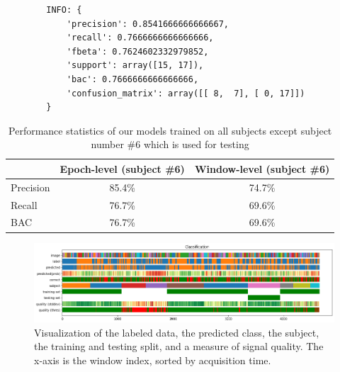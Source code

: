 
        \begin{verbatim}
        INFO: {
            'precision': 0.8541666666666667, 
            'recall': 0.7666666666666666, 
            'fbeta': 0.7624602332979852, 
            'support': array([15, 17]), 
            'bac': 0.7666666666666666, 
            'confusion_matrix': array([[ 8,  7], [ 0, 17]])
        }
        \end{verbatim}

        \begin{table}
            \begin{center}
                \begin{tabular}{lcc}
                  \toprule
                  & Epoch-level (subject \#6) & Window-level (subject \#6) \\ \midrule
                  Precision & 85.4\% & 74.7\% \\
                  Recall & 76.7\% & 69.6\% \\
                  BAC & 76.7\% & 69.6\% \\
                  \bottomrule
                  
                \end{tabular}
                \caption{Performance statistics of our models trained on all subjects except subject number \#6 which is used for testing}\label{fig:stats}
            \end{center}
        \end{table}

        \begin{figure}
        \centering
        \includegraphics[width=24cm]{img/timebars.png}
        \caption{Visualization of the labeled data, the predicted class, the subject, the training and testing split, and a measure of signal quality. The x-axis is the window index, sorted by acquisition time.}\label{fig:timebars}
        \end{figure}

